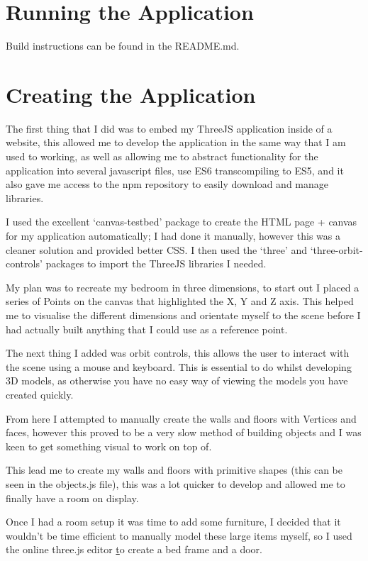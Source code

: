 \documentclass[runningheads,a4paper]{llncs}
\begin{document}
\section{Running the Application}
Build instructions can be found in the README.md.

\section{Creating the Application}
  The first thing that I did was to embed my ThreeJS application inside of a website, this allowed me to develop the application in the same way that I am used to working, as well as allowing me to abstract functionality for the application into several javascript files, use ES6 transcompiling to ES5, and it also gave me access to the npm repository to easily download and manage libraries. 

  I used the excellent `canvas-testbed' package to create the HTML page + canvas for my application automatically; I had done it manually, however this was a cleaner solution and provided better CSS\@. I then used the `three' and `three-orbit-controls' packages to import the ThreeJS libraries I needed. 

  My plan was to recreate my bedroom in three dimensions, to start out I placed a series of Points on the canvas that highlighted the X, Y and Z axis. This helped me to visualise the different dimensions and orientate myself to the scene before I had actually built anything that I could use as a reference point. 

  The next thing I added was orbit controls, this allows the user to interact with the scene using a mouse and keyboard. This is essential to do whilst developing 3D models, as otherwise you have no easy way of viewing the models you have created quickly. 

  From here I attempted to manually create the walls and floors with Vertices and faces, however this proved to be a very slow method of building objects and I was keen to get something visual to work on top of. 

  This lead me to create my walls and floors with primitive shapes (this can be seen in the objects.js file), this was a lot quicker to develop and allowed me to finally have a room on display. 

  Once I had a room setup it was time to add some furniture, I decided that it wouldn't be time efficient to manually model these large items myself, so I used the online three.js editor \href{https://threejs.org/editor/} to create a bed frame and a door.
\end{document}
